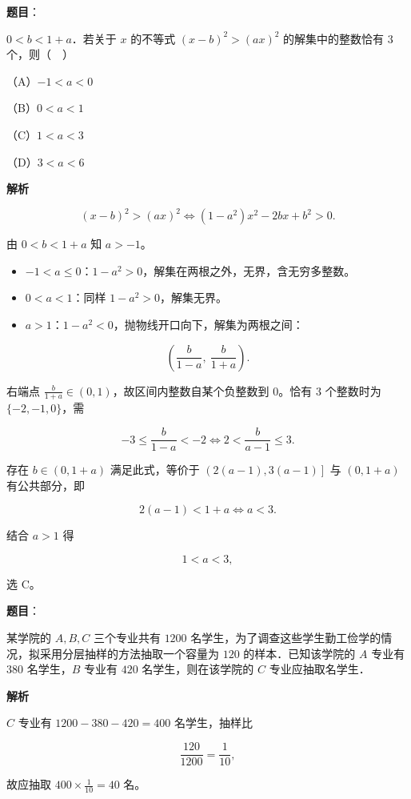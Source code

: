 \begin{answer}

\textbf{题目}：

$0<b<1+a$．若关于 $x$ 的不等式 $(x-b)^2>(ax)^2$ 的解集中的整数恰有 $3$ 个，则（　）

（A）$-1<a<0$

（B）$0<a<1$

（C）$1<a<3$

（D）$3<a<6$

\textbf{解析}

\nopagebreak[4]
\[(x-b)^2>(ax)^2\iff (1-a^2)x^2-2bx+b^2>0 .\]

由 $0<b<1+a$ 知 $a>-1$。

\begin{itemize}
\item $-1<a\leqslant0$：$1-a^2>0$，解集在两根之外，无界，含无穷多整数。
\item $0<a<1$：同样 $1-a^2>0$，解集无界。
\item $a>1$：$1-a^2<0$，抛物线开口向下，解集为两根之间：
\end{itemize}

\nopagebreak[4]
\[\left(\frac{b}{1-a},\ \frac{b}{1+a}\right).\]

右端点 $\frac{b}{1+a}\in(0,1)$，故区间内整数自某个负整数到 $0$。恰有 $3$ 个整数时为 $\{-2,-1,0\}$，需

\nopagebreak[4]
\[-3\leqslant\frac{b}{1-a}<-2
\iff 2<\frac{b}{a-1}\leqslant3 .\]

存在 $b\in(0,1+a)$ 满足此式，等价于 $\left(2(a-1),3(a-1)\right]$ 与 $(0,1+a)$ 有公共部分，即

\nopagebreak[4]
\[2(a-1)<1+a\iff a<3 .\]

结合 $a>1$ 得

\nopagebreak[4]
\[1<a<3,\]

选 C。


\end{answer}
\begin{answer}

\textbf{题目}：

某学院的 $A,B,C$ 三个专业共有 $1200$ 名学生，为了调查这些学生勤工俭学的情况，拟采用分层抽样的方法抽取一个容量为 $120$ 的样本．已知该学院的 $A$ 专业有 $380$ 名学生，$B$ 专业有 $420$ 名学生，则在该学院的 $C$ 专业应抽取\gkblank{}名学生．

\textbf{解析}

$C$ 专业有 $1200-380-420=400$ 名学生，抽样比

\nopagebreak[4]
\[\frac{120}{1200}=\frac1{10},\]

故应抽取 $400\times\frac1{10}=40$ 名。


\end{answer}
